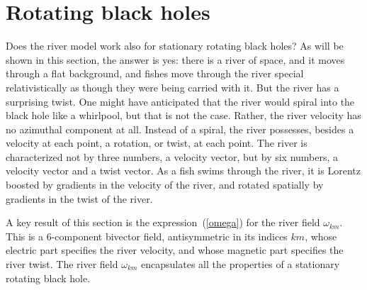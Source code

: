 \documentclass[twocolumn,showpacs,preprintnumbers,amsmath,amssymb,prb]{revtex4}
\begin{document}
\section{Rotating black holes}
\label{rotating}

Does the river model work also for stationary rotating black holes?
As will be shown in this section,
the answer is yes:
there is a river of space, and it moves through a flat background,
and fishes move through the river special relativistically
as though they were being carried with it.
But the river has a surprising twist.
One might have anticipated that the river would spiral into the black hole
like a whirlpool, but that is not the case.
Rather, the river velocity has no azimuthal component at all.
Instead of a spiral,
the river possesses,
besides a velocity at each point,
a rotation, or twist, at each point.
The river is characterized not by three numbers, a velocity vector,
but by six numbers, a velocity vector and a twist vector.
As a fish swims through the river,
it is Lorentz boosted by gradients in the velocity of the river,
and rotated spatially by gradients in the twist of the river.


A key result of this section is the expression~(\ref{omega})
for the river field $\omega_{km}$.
This is a 6-component bivector \cite{MTW,GLD} field,
antisymmetric in its indices $km$,
whose electric part specifies the river velocity,
and whose magnetic part specifies the river twist.
The river field $\omega_{km}$
encapsulates all the properties of a stationary rotating black hole.

\end{document}

